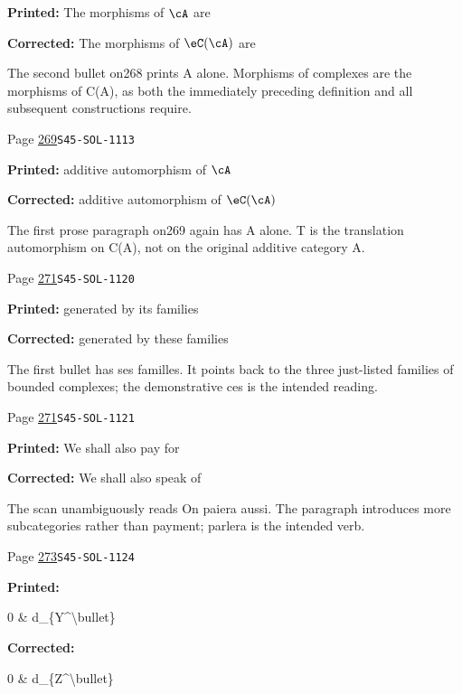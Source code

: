 \begin{description}
\par\noindent\textbf{Printed:} The morphisms of $\cA$ are
\par\noindent\textbf{Corrected:} The morphisms of $\eC(\cA)$ are
\par\noindent The second bullet on268 prints A alone. Morphisms of complexes are the morphisms of C(A), as both the immediately preceding definition and all subsequent constructions require.
\smallskip
\item[\hypertarget{apparatus:EN-0193}{193}] Page \hyperlink{printpage:en:269}{269}\quad\texttt{S45-SOL-1113}
\par\noindent\textbf{Printed:} additive automorphism of $\cA$
\par\noindent\textbf{Corrected:} additive automorphism of $\eC(\cA)$
\par\noindent The first prose paragraph on269 again has A alone. T is the translation automorphism on C(A), not on the original additive category A.
\smallskip
\item[\hypertarget{apparatus:EN-0194}{194}] Page \hyperlink{printpage:en:271}{271}\quad\texttt{S45-SOL-1120}
\par\noindent\textbf{Printed:} generated
    by its families
\par\noindent\textbf{Corrected:} generated
    by these families
\par\noindent The first bullet has ses familles. It points back to the three just-listed families of bounded complexes; the demonstrative ces is the intended reading.
\smallskip
\item[\hypertarget{apparatus:EN-0195}{195}] Page \hyperlink{printpage:en:271}{271}\quad\texttt{S45-SOL-1121}
\par\noindent\textbf{Printed:} We shall also pay for
\par\noindent\textbf{Corrected:} We shall also speak of
\par\noindent The scan unambiguously reads On paiera aussi. The paragraph introduces more subcategories rather than payment; parlera is the intended verb.
\smallskip
\item[\hypertarget{apparatus:EN-0196}{196}] Page \hyperlink{printpage:en:273}{273}\quad\texttt{S45-SOL-1124}
\par\noindent\textbf{Printed:} {\footnotesize\ttfamily\raggedright 0 \& d\_\allowbreak{}\{\allowbreak{}Y\textasciicircum{}\allowbreak{}\textbackslash{}\allowbreak{}bullet\}\allowbreak{}}
\par\noindent\textbf{Corrected:} {\footnotesize\ttfamily\raggedright 0 \& d\_\allowbreak{}\{\allowbreak{}Z\textasciicircum{}\allowbreak{}\textbackslash{}\allowbreak{}bullet\}\allowbreak{}}

\end{description}
